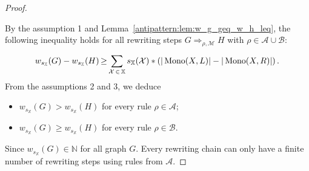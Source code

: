 \begin{proof} 
    \label{antipattern:proof:thm:termination_grs}
    
    By the assumption 1 and Lemma~\ref{antipattern:lem:w_g_geq_w_h_leq}, the following inequality holds for all rewriting steps $G \mathop{\Rightarrow}_{\rho, \mathcal{M}} H$  with $\rho \mathop{\in} \mathcal{A} \mathop{\cup} \mathcal{B}$:
      \[
        w_{s_\mathbb{X}}(G) - w_{s_\mathbb{X}}(H) 
        \mathop{\geq} 
        \sum_{\mathcal{X} \mathop{\in} \mathbb{X}}^{}s_\mathbb{X}(\mathcal{X}) * \left( 
            |\operatorname{Mono}(X,L)| -
            |\operatorname{Mono}(X,R)|
            \right).
    \]
    \noindent From the assumptions 2 and 3, we deduce 
    \begin{itemize}
        \item \( w_{s_\mathbb{X}}(G) \mathop{>} w_{s_\mathbb{X}}(H) \) for every rule \(\rho \mathop{\in} \mathcal{A}\);
        \item  \( w_{s_\mathbb{X}}(G) \mathop{\geq} w_{s_\mathbb{X}}(H) \) for every rule \(\rho \mathop{\in} \mathcal{B}\).
    \end{itemize}
    Since $w_{s_\mathbb{X}}(G) \mathop{\in} \mathbb{N}$ for all graph $G$. Every rewriting chain can only have a finite number of rewriting steps using rules from $\mathcal{A}$.
\end{proof} 